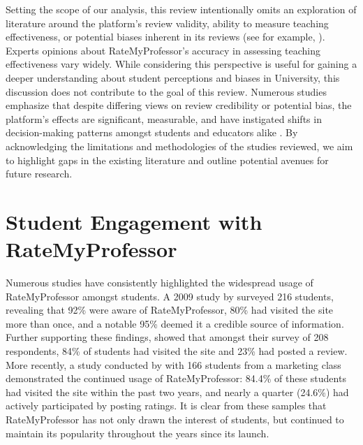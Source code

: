 \documentclass[twocolumn, doc,12pt]{apa7}
\begin{document}
Setting the scope of our analysis, this review intentionally omits an exploration of literature around the platform's review validity, ability to measure teaching effectiveness, or potential biases inherent in its reviews (see for example, \textcite{reid_role_2010,hartman_what_2013, azab_analysing_2016, boring_gender_2017, rosen_correlations_2018, baker_quantcrit_2019, gordon_role_2021}). Experts opinions about RateMyProfessor’s accuracy in assessing teaching effectiveness vary widely. While considering this perspective is useful for gaining a deeper understanding about student perceptions and biases in University, this discussion does not contribute to the goal of this review.  Numerous studies emphasize that despite differing views on review credibility or potential bias, the platform's effects are significant, measurable, and have instigated shifts in decision-making patterns amongst students and educators alike \textcite{johnson_i_2014, boswell_ratemyprofessors_2016, boswell_effects_2020}. By acknowledging the limitations and methodologies of the studies reviewed, we aim to highlight gaps in the existing literature and outline potential avenues for future research.

\section{Student Engagement with RateMyProfessor}
Numerous studies have consistently highlighted the widespread usage of RateMyProfessor amongst students. A 2009 study by \textcite{davison_how_2009} surveyed 216 students, revealing that 92\% were aware of RateMyProfessor, 80\% had visited the site more than once, and a notable 95\% deemed it a credible source of information. Further supporting these findings, \textcite{bleske-rechek_ratemyprofessors_2010} showed that amongst their survey of 208 respondents, 84\% of students had visited the site and 23\% had posted a review. More recently, a study conducted by \textcite{chiang_students_2017} with 166 students from a marketing class demonstrated the continued usage of RateMyProfessor: 84.4\% of these students had visited the site within the past two years, and nearly a quarter (24.6\%) had actively participated by posting ratings. It is clear from these samples that RateMyProfessor has not only drawn the interest of students, but continued to maintain its popularity throughout the years since its launch.
\end{document}
